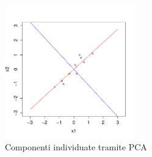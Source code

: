 \begin{esempio}
\begin{figure}[tbp]
\centering
  \includegraphics[width=0.5\textwidth]{images/components_scaled}
  \caption{Componenti individuate tramite PCA}
  \label{fig:components_scaled}
\end{figure}
\end{esempio}

